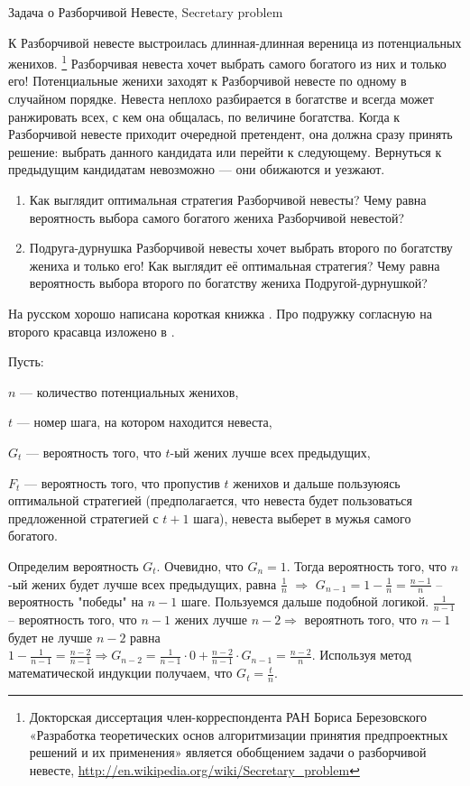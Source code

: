 \documentclass[12pt]{article}
\newcounter{problem}[section]
\newenvironment{problem}%
{%
\refstepcounter{problem}%
     \hypertarget{problem:{\thesection.\theproblem}}{} %
     \Writetofile{solution_file}{\protect\hypertarget{soln:\thesection.\theproblem}{}}
     \begin{myenum}[label=\bfseries\protect\hyperlink{soln:\thesection.\theproblem}{\thesection.\theproblem},ref=\thesection.\theproblem]
     \item%
    }%
    {%
    \end{myenum}}
\begin{document}
\begin{problem}
Задача о Разборчивой Невесте, Secretary problem

К Разборчивой невесте выстроилась длинная-длинная вереница из потенциальных женихов.
\footnote{Докторская диссертация член-корреспондента РАН Бориса Березовского
«Разработка теоретических основ алгоритмизации принятия предпроектных решений и их применения»
является обобщением задачи о разборчивой невесте, \url{http://en.wikipedia.org/wiki/Secretary_problem}}
Разборчивая невеста хочет выбрать самого богатого из них и только его!
Потенциальные женихи заходят к Разборчивой невесте по одному в случайном порядке.
Невеста неплохо разбирается в богатстве и всегда может ранжировать всех, с кем она общалась,
по величине богатства. Когда к Разборчивой невесте приходит очередной претендент,
она должна сразу принять решение: выбрать данного кандидата или перейти к следующему.
Вернуться к предыдущим кандидатам невозможно — они обижаются и уезжают.

\begin{enumerate}
\item Как выглядит оптимальная стратегия Разборчивой невесты? Чему равна вероятность выбора самого богатого жениха Разборчивой невестой?
\item Подруга-дурнушка Разборчивой невесты хочет выбрать второго по богатству жениха и только его!
Как выглядит её оптимальная стратегия?
Чему равна вероятность выбора второго по богатству жениха Подругой-дурнушкой?
\end{enumerate}

\begin{sol}

На русском хорошо написана короткая книжка \cite{zade2003nevesta}.
Про подружку согласную на второго красавца изложено в \cite{vanderbei2011postdoc}.


Пусть:

$n$ — количество потенциальных женихов,

$t$ — номер шага, на котором находится невеста,

$G_t$ — вероятность того, что $t$-ый жених лучше всех предыдущих,

$F_t$ — вероятность того, что пропустив $t$ женихов и дальше пользуюясь оптимальной
стратегией (предполагается, что невеста будет пользоваться предложенной стратегией с $t+1$
шага), невеста выберет в мужья самого богатого.

Определим вероятность $G_t$. Очевидно, что $G_n = 1$. Тогда вероятность того, что $n$-ый жених будет лучше всех предыдущих, равна  $\frac{1}{n}$ $\Rightarrow$ $G_{n-1}=1-\frac{1}{n}=\frac{n-1}{n}$ – вероятность "победы" на $n-1$ шаге. Пользуемся дальше подобной логикой. $\frac{1}{n-1}$ – вероятность того, что $n-1$ жених лучше $n-2\Rightarrow$ вероятноть того, что $n-1$ будет не лучше $n-2$ равна $1-\frac{1}{n-1}=\frac{n-2}{n-1}\Rightarrow G_{n-2}= \frac{1}{n-1}\cdot 0+\frac{n-2}{n-1}\cdot G_{n-1}=\frac{n-2}{n}$. Используя метод математической индукции получаем, что $G_t=\frac{t}{n}$.


\end{sol}
\end{problem}
\end{document}
